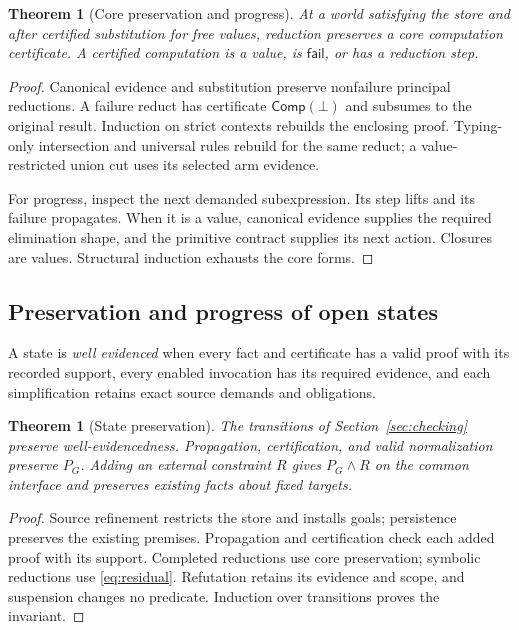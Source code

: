 \documentclass[10pt,a4paper]{article}
\newcommand{\Comp}{\mathsf{Comp}}
\newcommand{\Fail}{\mathsf{fail}}
\newtheorem{theorem}[definition]{Theorem}
\theoremstyle{remark}
\begin{document}
\begin{theorem}[Core preservation and progress]\label{thm:preservation}
\label{thm:progress}
At a world satisfying the store and after certified substitution for free
values, reduction preserves a core computation certificate. A certified
computation is a value, is $\Fail$, or has a reduction step.
\end{theorem}
\begin{proof}
Canonical evidence and substitution preserve nonfailure principal reductions.
A failure reduct has certificate $\Comp(\bot)$ and subsumes to the original
result. Induction on strict contexts rebuilds the enclosing proof. Typing-only
intersection and universal rules rebuild for the same reduct; a value-restricted
union cut uses its selected arm evidence.

For progress, inspect the next demanded subexpression. Its step lifts and its
failure propagates. When it is a value, canonical evidence supplies the required
elimination shape, and the primitive contract supplies its next action.
Closures are values. Structural induction exhausts the core forms.
\end{proof}

\subsection{Preservation and progress of open states}
A state is \emph{well evidenced} when every fact and certificate has a valid
proof with its recorded support, every enabled invocation has its required
evidence, and each simplification retains exact source demands and obligations.

\begin{theorem}[State preservation]\label{thm:state-preservation}
The transitions of Section~\ref{sec:checking} preserve well-evidencedness.
Propagation, certification, and valid normalization preserve $P_G$. Adding an
external constraint $R$ gives $P_G\land R$ on the common interface and preserves
existing facts about fixed targets.
\end{theorem}
\begin{proof}
Source refinement restricts the store and installs goals; persistence preserves
the existing premises. Propagation and certification check each added proof
with its support. Completed reductions use core preservation; symbolic
reductions use \eqref{eq:residual}. Refutation retains its evidence and scope,
and suspension changes no predicate. Induction over transitions proves the
invariant.
\end{proof}
\end{document}
